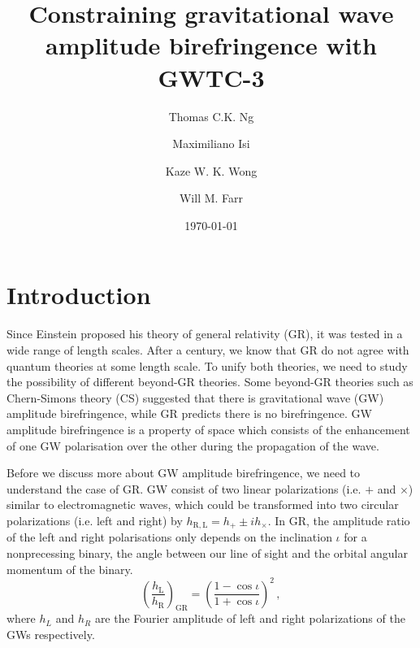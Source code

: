 \documentclass[twocolumn]{aastex631}
\begin{document}
\title{Constraining gravitational wave amplitude birefringence with GWTC-3}

\author{Thomas C.K. Ng}

\author{Maximiliano Isi}

\author{Kaze W. K. Wong}

\author{Will M. Farr}

\date{\today}

\begin{abstract}

\end{abstract}

\section{Introduction}

Since Einstein proposed his theory of general relativity (GR), it was tested in a wide range of length scales.
After a century, we know that GR do not agree with quantum theories at some length scale.
To unify both theories, we need to study the possibility of different beyond-GR theories.
Some beyond-GR theories such as Chern-Simons theory (CS) suggested that there is gravitational wave (GW) amplitude birefringence,
while GR predicts there is no birefringence.
GW amplitude birefringence is a property of space which consists of the enhancement of one GW polarisation over the other during the propagation of the wave.


Before we discuss more about GW amplitude birefringence, we need to understand the case of GR.
GW consist of two linear polarizations (i.e. $+$ and $\times$) similar to electromagnetic waves,
which could be transformed into two circular polarizations (i.e. left and right) by $h_{\mathrm{R}, \mathrm{L}} = h_+ \pm i h_\times$.
In GR, the amplitude ratio of the left and right polarisations only depends on the inclination $\iota$ for a nonprecessing binary,
the angle between our line of sight and the orbital angular momentum of the binary.
\begin{equation}
    \left(\frac{h_\mathrm{L}}{h_\mathrm{R}}\right)_\mathrm{GR}=\left(\frac{1-\cos\iota}{1+\cos\iota}\right)^2\,,
\end{equation}where $h_L$ and $h_R$ are the Fourier amplitude of left and right polarizations of the GWs respectively.
\end{document}
